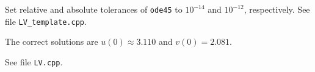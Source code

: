 \begin{problem}
\begin{subproblem}[3]
\begin{hint}
  Set relative and absolute tolerances of \texttt{ode45} to $10^{-14}$ and $10^{-12}$, respectively. See file \texttt{LV\_template.cpp}.
\end{hint}

\begin{hint}
The correct solutions are $u(0)\approx 3.110$ and $v(0)=2.081$.
\end{hint}

\begin{solution}
See file \texttt{LV.cpp}.
\end{solution}
\end{subproblem}


%

%
\end{problem}
